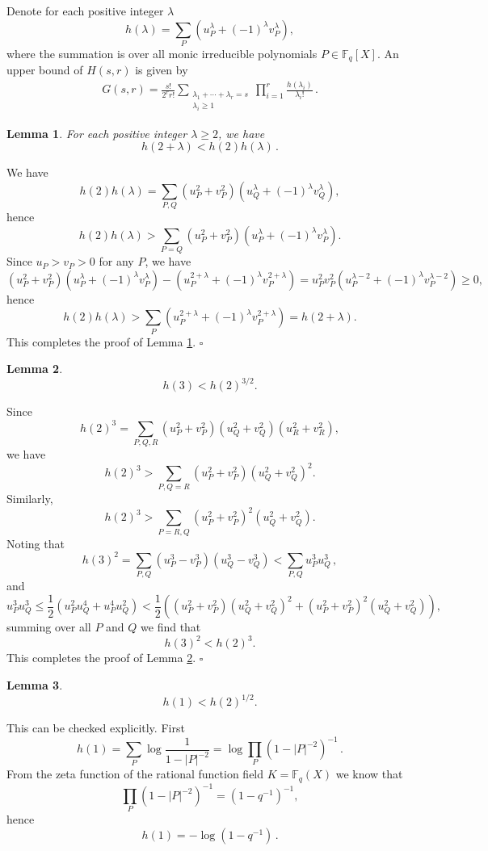 \documentclass[12pt]{amsart}
\theoremstyle{plain}
\newtheorem{lemma}{Lemma}
\newcommand{\F}{{\mathbb F}_q}
\begin{document}
 Denote for each positive integer $\lambda$
\[h(\lambda)=\sum_{P}\left(u_{P}^{\lambda}+(-1)^{\lambda}
v_{P}^{\lambda}\right), \]
where the summation is over all monic irreducible polynomials $P \in \F[X]$. An upper bound of $H(s,r)$ is given by
\begin{eqnarray} \label{6:gsr} G(s,r) = \frac{s!}{2^r r!}\sum_{\substack{\lambda_1+\cdots+\lambda_r=s\\ \lambda_i \ge 1}} \prod_{i=1}^r \frac{h(\lambda_i)}{\lambda_i!}\,.\end{eqnarray}

\begin{lemma} \label{6:lem1} For each positive integer $\lambda \ge 2$, we have
\[h(2+\lambda) < h(2)h(\lambda)\,.\]
\end{lemma}
 We have
\[h(2)h(\lambda)=\sum_{P,Q} \left(u_{P}^{2}+
v_{P}^{2}\right)\left(u_{Q}^{\lambda}+(-1)^{\lambda}
v_{Q}^{\lambda}\right),\]
hence
\[h(2)h(\lambda)>\sum_{P=Q} \left(u_{P}^{2}+
v_{P}^{2}\right)\left(u_{P}^{\lambda}+
(-1)^{\lambda}v_P^{\lambda}\right).\]
Since $u_P>v_P>0$ for any $P$, we have
\[\left(u_{P}^{2}+
v_{P}^{2}\right)\left(u_{P}^{\lambda}+
(-1)^{\lambda}v_P^{\lambda}\right)-\left(u_{P}^{2+ \lambda}+(-1)^{\lambda}
v_{P}^{2+\lambda}\right)=u_P^2v_P^2\left(u_P^{\lambda-2}+
(-1)^{\lambda}v_P^{\lambda-2}\right) \ge 0,\]
hence
\[h(2)h(\lambda)>\sum_{P} \left(u_{P}^{2+ \lambda}+(-1)^{\lambda}
v_{P}^{2+\lambda}\right)=h(2+\lambda).\]
This completes the proof of Lemma \ref{6:lem1}. \quad $\square$

\begin{lemma} \label{6:lem2}
\[h(3) < h(2)^{3/2}.\]
\end{lemma}
 Since
\[h(2)^3=\sum_{P,Q,R}\left(u_P^2+v_P^2\right)
\left(u_Q^2+v_Q^2\right)\left(u_R^2+v_R^2\right),\]
we have
\[h(2)^3>\sum_{P,Q=R}\left(u_P^2+v_P^2\right)
\left(u_Q^2+v_Q^2\right)^2. \]
Similarly,
\[h(2)^3>\sum_{P=R,Q}\left(u_P^2+v_P^2\right)^2
\left(u_Q^2+v_Q^2\right). \]
Noting that
\[h(3)^2=\sum_{P,Q} \left(u_P^3-v_P^3\right)\left(u_Q^3-v_Q^3\right)<\sum_{P,Q} u_P^3u_Q^3\,,\]
and
\[u_P^3u_Q^3 \le \frac{1}{2}\left( u_P^2u_Q^4+u_P^4u_Q^2\right)<\frac{1}{2}\left( \left(u_P^2+v_P^2\right)\left(u_Q^2+v_Q^2\right)^2+
\left(u_P^2+v_P^2\right)^2\left(u_Q^2+v_Q^2\right)\right),\]
summing over all $P$ and $Q$ we find that
\[h(3)^2 < h(2)^3.\]
This completes the proof of Lemma \ref{6:lem2}. \quad $\square$

\begin{lemma} \label{6:lem22}
\[h(1)<h(2)^{1/2}.\]
\end{lemma}
 This can be checked explicitly. First
\[h(1)=\sum_{P} \log \frac{1}{1-|P|^{-2}}=\log \prod_{P}\left(1-|P|^{-2}\right)^{-1}\,.\]
From the zeta function of the rational function field $K=\F(X)$ we know that
\[\prod_{P}\left(1-|P|^{-2}\right)^{-1}=\left(1-q^{-1}\right)^{-1},\]
hence
\[h(1)=-\log \left(1-q^{-1}\right)\,.\]
\end{document}
